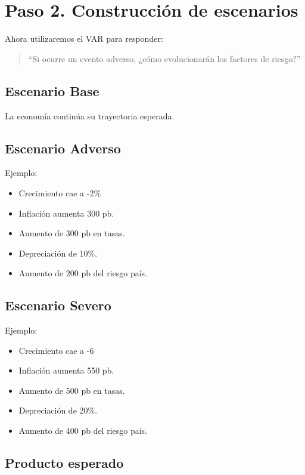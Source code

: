 \documentclass[11pt]{article}
\begin{document}
\section{Paso 2. Construcción de escenarios}

Ahora utilizaremos el VAR para responder:

\begin{quote}
``Si ocurre un evento adverso, ¿cómo evolucionarán los factores de riesgo?''
\end{quote}

\subsection*{Escenario Base}

La economía continúa su trayectoria esperada.

\subsection*{Escenario Adverso}

Ejemplo:

\begin{itemize}
\item Crecimiento cae a -2\%
\item Inflación aumenta 300 pb.
\item Aumento de 300 pb en tasas.
\item Depreciación de 10\%.
\item Aumento de 200 pb del riesgo país.
\end{itemize}

\subsection*{Escenario Severo}

Ejemplo:

\begin{itemize}
\item Crecimiento cae a -6%
\item Inflación aumenta 550 pb.
\item Aumento de 500 pb en tasas.
\item Depreciación de 20\%.
\item Aumento de 400 pb del riesgo país.
\end{itemize}

\subsection*{Producto esperado}
\end{document}
